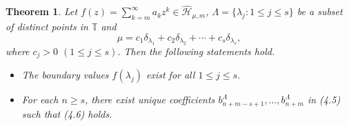 \documentclass[12pt,reqno]{amsart}
\newtheorem{theorem}{Theorem}[section]
\begin{document}
\begin{theorem}\label{tm5.1}
Let $f(z) = \sum\limits_{k = m}^\infty  {{a_k}{z^k}} \in \widehat{\mathcal{H}}_{\mu,m}$, $\Lambda  = \{ {\lambda _j}:1 \le j \le s\} $ be a subset of distinct points in $\mathbb{T}$ and
$$\mu  = {c_1}{\delta _{{\lambda _1}}} + {c_2}{\delta _{{\lambda _2}}} +  \cdots  + {c_s}{\delta _{{\lambda _s}}},$$
where \( c_j > 0 \) $\left( {1 \le j \le s} \right)$. Then the following statements hold.
\begin{itemize}
\item[(i)] The boundary values $f(\lambda_j)$ exist for all $1\le j\le s$.
\item[(ii)] For each $n\ge s$, there exist unique coefficients
$b_{n+m-s+1}^\Lambda,\ldots,b_{n+m}^\Lambda$ in (4.5)
such that (4.6) holds.
\end{itemize}


\end{theorem}
\end{document}
